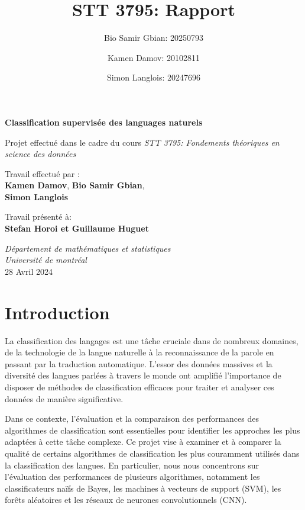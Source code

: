 \documentclass[11pt]{article}
\title{STT 3795: Rapport}
\author{Bio Samir Gbian: 20250793}
\author{Kamen Damov: 20102811}
\author{Simon Langlois: 20247696}
\affil{Département de mathématiques et statistiques}
\affil{Université de Montréal}
\begin{document}
\begin{titlepage}
    \begin{center}
        \vspace*{1cm}
            
        \Huge
        \textbf{Classification supervisée des languages naturels}
            
        \vspace{0.5cm}
        \LARGE
        Projet effectué dans le cadre du cours \textit{STT 3795: Fondements théoriques en science des données}
            
        \vspace{1.5cm}

        Travail effectué par :\\
        \textbf{Kamen Damov},
        \textbf{Bio Samir Gbian},\\
        \textbf{Simon Langlois}
            
        \vfill
            
        Travail présenté à:\\
        \textbf{Stefan Horoi et Guillaume Huguet}
            
        \vspace{0.8cm}
                        
        \Large
        \textit{Département de mathématiques et statistiques} \\
        \textit{Université de montréal} \\
        28 Avril 2024
            
    \end{center}
\end{titlepage}

\tableofcontents

\newpage
\section{Introduction}
La classification des langages est une tâche cruciale dans de nombreux domaines, de la technologie de la langue naturelle à la reconnaissance de la parole en passant par la traduction automatique. L'essor des données massives et la diversité des langues parlées à travers le monde ont amplifié l'importance de disposer de méthodes de classification efficaces pour traiter et analyser ces données de manière significative.

Dans ce contexte, l'évaluation et la comparaison des performances des algorithmes de classification sont essentielles pour identifier les approches les plus adaptées à cette tâche complexe. Ce projet vise à examiner et à comparer la qualité de certains algorithmes de classification les plus couramment utilisés dans la classification des langues. En particulier, nous nous concentrons sur l'évaluation des performances de plusieurs algorithmes, notamment les classificateurs naïfs de Bayes, les machines à vecteurs de support (SVM), les forêts aléatoires et les réseaux de neurones convolutionnels (CNN).
\end{document}
